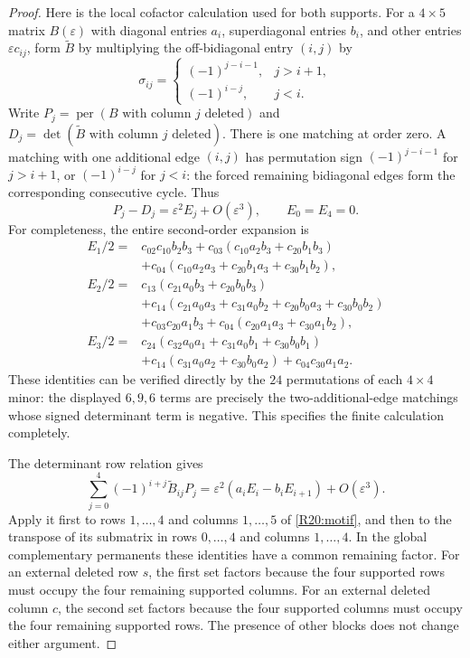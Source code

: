 \documentclass[11pt,a4paper]{article}
\theoremstyle{definition}\newtheorem{definition}{Definition}
\begin{document}
\begin{proof}
Here is the local cofactor calculation used for both supports.
For a $4\times5$ matrix $B(\varepsilon)$ with diagonal entries
$a_i$, superdiagonal entries $b_i$, and other entries
$\varepsilon c_{ij}$, form $\widetilde B$ by multiplying the
off-bidiagonal entry $(i,j)$ by
\[
 \sigma_{ij}=\begin{cases}
 (-1)^{j-i-1},&j>i+1,\\
 (-1)^{i-j},&j<i.
 \end{cases}
\]
Write $P_j=\operatorname{per}(B\text{ with column }j\text{ deleted})$
and $D_j=\det(\widetilde B\text{ with column }j\text{ deleted})$.
There is one matching at order zero. A matching with one additional
edge $(i,j)$ has permutation sign $(-1)^{j-i-1}$ for $j>i+1$,
or $(-1)^{i-j}$ for $j<i$: the forced remaining bidiagonal edges
form the corresponding consecutive cycle. Thus
\begin{equation}\label{R20:secondorder}
 P_j-D_j=\varepsilon^2 E_j+O(\varepsilon^3),
 \qquad E_0=E_4=0.
\end{equation}
For completeness, the entire second-order expansion is
\begin{align*}
 E_1/2={}&c_{02}c_{10}b_2b_3
 +c_{03}(c_{10}a_2b_3+c_{20}b_1b_3)\\
 &+c_{04}(c_{10}a_2a_3+c_{20}b_1a_3+c_{30}b_1b_2),\\
 E_2/2={}&c_{13}(c_{21}a_0b_3+c_{20}b_0b_3)\\
 &+c_{14}(c_{21}a_0a_3+c_{31}a_0b_2
                   +c_{20}b_0a_3+c_{30}b_0b_2)\\
 &+c_{03}c_{20}a_1b_3
 +c_{04}(c_{20}a_1a_3+c_{30}a_1b_2),\\
 E_3/2={}&c_{24}(c_{32}a_0a_1+c_{31}a_0b_1+c_{30}b_0b_1)\\
 &+c_{14}(c_{31}a_0a_2+c_{30}b_0a_2)
 +c_{04}c_{30}a_1a_2.
\end{align*}
These identities can be verified directly by the $24$ permutations
of each $4\times4$ minor: the displayed $6,9,6$ terms are precisely
the two-additional-edge matchings whose signed determinant term is
negative. This specifies the finite calculation completely.

The determinant row relation gives
\begin{equation}\label{R20:relation}
 \sum_{j=0}^4(-1)^{i+j}\widetilde B_{ij}P_j
 =\varepsilon^2(a_iE_i-b_iE_{i+1})+O(\varepsilon^3).
\end{equation}
Apply it first to rows $1,\ldots,4$ and columns $1,\ldots,5$
of \eqref{R20:motif}, and then to the transpose of its submatrix
in rows $0,\ldots,4$ and columns $1,\ldots,4$.
In the global complementary permanents these identities have a
common remaining factor. For an external deleted row $s$, the
first set factors because the four supported rows must occupy the
four remaining supported columns. For an external deleted column
$c$, the second set factors because the four supported columns
must occupy the four remaining supported rows. The presence of
other blocks does not change either argument.


\end{proof}
\end{document}
